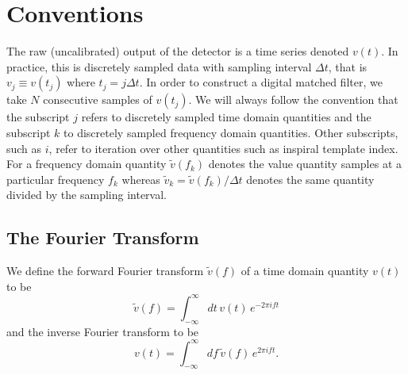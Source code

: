 
\section{Conventions}
\label{s:conventions}

The raw (uncalibrated) output of the detector is a time series denoted $v(t)$.
In practice, this is discretely sampled data with sampling interval $\Delta
t$, that is $v_j \equiv v(t_j)$ where $t_j = j\Delta t$.  In order to
construct a digital matched filter, we take $N$ consecutive samples of
$v(t_j)$. We will always follow the convention that the subscript $j$ refers to
discretely sampled time domain quantities and the subscript $k$ to discretely
sampled frequency domain quantities. Other subscripts, such as $i$, refer to
iteration over other quantities such as inspiral template index. For a
frequency domain quantity $\tilde{v}(f_k)$ denotes the value quantity samples
at a particular frequency $f_k$ whereas $\tilde{v}_k = \tilde{v}(f_k) / \Delta
t$ denotes the same quantity divided by the sampling interval.

\subsection{The Fourier Transform}
\label{ss:ftconv}

We define the forward Fourier transform $\tilde{v}(f)$ of a time domain
quantity $v(t)$ to be
\begin{equation}
\label{eq:ft}
\tilde{v}(f)=\int_{-\infty}^\infty dt\,v(t)\, e^{- 2 \pi i f t}
\end{equation}
and the inverse Fourier transform to be 
\begin{equation}
\label{eq:ift}
v(t)=\int_{-\infty}^\infty df\,\tilde{v}(f)\, e^{2 \pi i f t}.
\end{equation}

